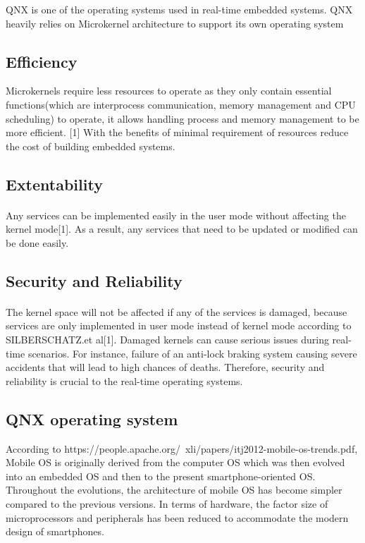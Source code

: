 \documentclass[conference]{IEEEtran}
\begin{document}
QNX is one of the operating systems used in real-time embedded systems. QNX heavily relies on Microkernel architecture to support its own operating system

\subsection{Efficiency}
Microkernels require less resources to operate as they only contain essential functions(which are interprocess communication, memory management and CPU scheduling) to operate, it allows handling process and memory management to be more efficient. [1] With the benefits of minimal requirement of resources reduce the cost of building embedded systems.

\subsection{Extentability}
\paragraph{}
Any services can be implemented easily in the user mode without affecting the kernel mode[1]. As a result, any services that need to be updated or modified can be done easily.

\subsection{Security and Reliability}
\paragraph{}
The kernel space will not be affected if any of the services is damaged, because services are only implemented in user mode instead of kernel mode according to SILBERSCHATZ.et al[1]. Damaged kernels can cause serious issues during real-time scenarios. For instance, failure of an anti-lock braking system causing severe accidents that will lead to high chances of deaths. Therefore, security and reliability is crucial to the real-time operating systems.

\subsection{QNX operating system}
According to https://people.apache.org/~xli/papers/itj2012-mobile-os-trends.pdf, Mobile OS is originally derived from the computer OS which was then evolved into an embedded OS and then to the present smartphone-oriented OS. Throughout the evolutions, the architecture of mobile OS has become simpler compared to the previous versions. In terms of hardware, the factor size of microprocessors and peripherals has been reduced to accommodate the modern design of smartphones. 
\end{document}
